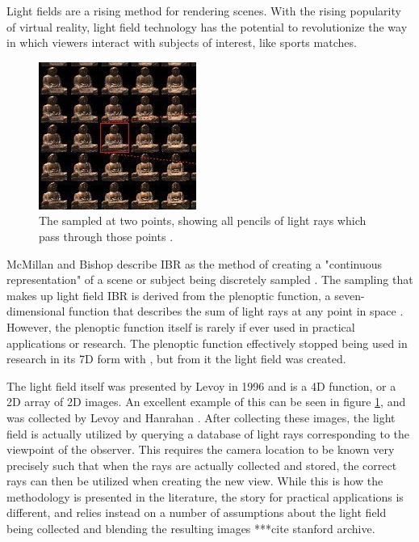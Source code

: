\documentclass[12pt]{report}
\begin{document}
Light fields are a rising method for rendering scenes. With the rising popularity of virtual reality, light field technology has the potential to revolutionize the way in which viewers interact with subjects of interest, like sports matches.

\begin{figure}[!ht]
	\centering
	\includegraphics[scale=0.75]{levoy_lf.jpg}
	\caption{The sampled at two points, showing all pencils of light rays which pass through those points \cite{Adelson91}.}
	\label{fig:levoy_lf}
\end{figure}

McMillan and Bishop describe IBR as the method of creating a "continuous representation" of a scene or subject being discretely sampled \cite{McMillan95}. The sampling that makes up light field IBR is derived from the plenoptic function, a seven-dimensional function that describes the sum of light rays at any point in space \cite{Adelson91}. However, the plenoptic function itself is rarely if ever used in practical applications or research. The plenoptic function effectively stopped being used in research in its 7D form with \cite{Adelson91}, but from it the light field was created.

The light field itself was presented by Levoy in 1996 and is a 4D function, or a 2D array of 2D images. An excellent example of this can be seen in figure \ref{fig:levoy_lf}, and was collected by Levoy and Hanrahan \cite{Levoy96}. After collecting these images, the light field is actually utilized by querying a database of light rays corresponding to the viewpoint of the observer. This requires the camera location to be known very precisely such that when the rays are actually collected and stored, the correct rays can then be utilized when creating the new view. While this is how the methodology is presented in the literature, the story for practical applications is different, and relies instead on a number of assumptions about the light field being collected and blending the resulting images ***cite stanford archive.
\end{document}
